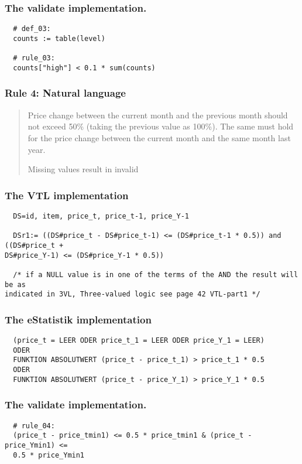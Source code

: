 \subsubsection*{The validate implementation.}
\begin{verbatim}
  # def_03:
  counts := table(level)

  # rule_03:
  counts["high"] < 0.1 * sum(counts)
\end{verbatim}


\newpage

\subsubsection*{  Rule 4: Natural language}
\begin{quote}


Price change between the current month and the previous month should not exceed 50\% (taking the previous value as 100\%). The same must hold for the price change between the current month and the same month last year.

Missing values result in invalid



\end{quote}
\subsubsection*{The VTL implementation}
\begin{verbatim}
  DS=id, item, price_t, price_t-1, price_Y-1

  DSr1:= ((DS#price_t - DS#price_t-1) <= (DS#price_t-1 * 0.5)) and ((DS#price_t +
DS#price_Y-1) <= (DS#price_Y-1 * 0.5))

  /* if a NULL value is in one of the terms of the AND the result will be as
indicated in 3VL, Three-valued logic see page 42 VTL-part1 */
\end{verbatim}
\subsubsection*{The eStatistik implementation}
\begin{verbatim}
  (price_t = LEER ODER price_t_1 = LEER ODER price_Y_1 = LEER)
  ODER
  FUNKTION ABSOLUTWERT (price_t - price_t_1) > price_t_1 * 0.5
  ODER
  FUNKTION ABSOLUTWERT (price_t - price_Y_1) > price_Y_1 * 0.5
\end{verbatim}
\subsubsection*{The validate implementation.}
\begin{verbatim}
  # rule_04:
  (price_t - price_tmin1) <= 0.5 * price_tmin1 & (price_t - price_Ymin1) <=
  0.5 * price_Ymin1
\end{verbatim}


